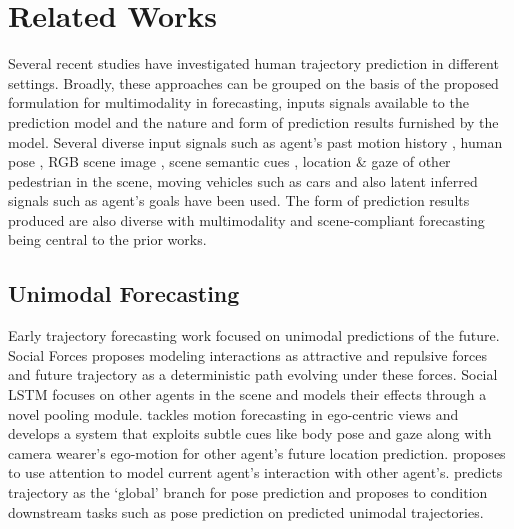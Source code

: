 \documentclass[final]{cvpr}
\begin{document}
\section{Related Works}
Several recent studies have investigated human trajectory prediction in different settings. Broadly, these approaches can be grouped on the basis of the proposed formulation for multimodality in forecasting, inputs signals available to the prediction model and the nature and form of prediction results furnished by the model. Several diverse input signals such as agent's past motion history \cite{helbing1995social}, human pose \cite{mangalam2020disentangling}, RGB scene image \cite{gupta2018social, sadeghian2019sophie, caoHMP2020, lee2017desire, liang2020garden}, scene semantic cues \cite{caoHMP2020}, location \cite{salzmann2020trajectron++, li2019conditional, bhattacharyya2019conditional}  \& gaze of other pedestrian \cite{mangalam2020disentangling, yagi2018future} in the scene, moving vehicles such as cars \cite{salzmann2020trajectron++} and also latent inferred signals such as agent's goals \cite{mangalam2020not} have been used. The form of prediction results produced are also diverse with multimodality \cite{liang2020garden} and scene-compliant forecasting being central to the prior works. 

\subsection{Unimodal Forecasting}
Early trajectory forecasting work focused on unimodal predictions of the future. Social Forces \cite{helbing1995social} proposes modeling interactions as attractive and repulsive forces and future trajectory as a deterministic path evolving under these forces. Social LSTM \cite{alahi2016social} focuses on other agents in the scene and models their effects through a novel pooling module. \cite{yagi2018future} tackles motion forecasting in ego-centric views and develops a system that exploits subtle cues like body pose and gaze along with camera wearer's ego-motion for other agent's future location prediction. \cite{vemula2018social} proposes to use attention to model current agent's interaction with other agent's. \cite{mangalam2020disentangling} predicts trajectory as the `global' branch for pose prediction and proposes to condition downstream tasks such as pose prediction on predicted unimodal trajectories. 
\end{document}
